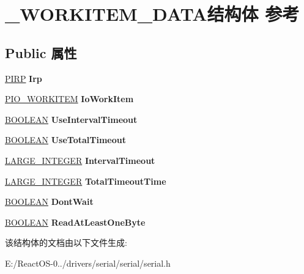 \hypertarget{struct___w_o_r_k_i_t_e_m___d_a_t_a}{}\section{\+\_\+\+W\+O\+R\+K\+I\+T\+E\+M\+\_\+\+D\+A\+T\+A结构体 参考}
\label{struct___w_o_r_k_i_t_e_m___d_a_t_a}
\subsection*{Public 属性}
\begin{DoxyCompactItemize}
\item 
\mbox{\label{struct___w_o_r_k_i_t_e_m___d_a_t_a_ac4972c116f355447807c84ffda0be9cf}} 
\hyperlink{interfacevoid}{P\+I\+RP} {\bfseries Irp}
\item 
\mbox{\label{struct___w_o_r_k_i_t_e_m___d_a_t_a_af7661dc7439025cd39318204c84219e5}} 
\hyperlink{struct___i_o___w_o_r_k_i_t_e_m}{P\+I\+O\+\_\+\+W\+O\+R\+K\+I\+T\+EM} {\bfseries Io\+Work\+Item}
\item 
\mbox{\label{struct___w_o_r_k_i_t_e_m___d_a_t_a_ad078ddd3267206279fa9e5b973d47859}} 
\hyperlink{_processor_bind_8h_a112e3146cb38b6ee95e64d85842e380a}{B\+O\+O\+L\+E\+AN} {\bfseries Use\+Interval\+Timeout}
\item 
\mbox{\label{struct___w_o_r_k_i_t_e_m___d_a_t_a_a3a4d9a446d4adfda568f34b0472eb627}} 
\hyperlink{_processor_bind_8h_a112e3146cb38b6ee95e64d85842e380a}{B\+O\+O\+L\+E\+AN} {\bfseries Use\+Total\+Timeout}
\item 
\mbox{\label{struct___w_o_r_k_i_t_e_m___d_a_t_a_a1150fc9fd046ec62beb5b4f586494ad3}} 
\hyperlink{union___l_a_r_g_e___i_n_t_e_g_e_r}{L\+A\+R\+G\+E\+\_\+\+I\+N\+T\+E\+G\+ER} {\bfseries Interval\+Timeout}
\item 
\mbox{\label{struct___w_o_r_k_i_t_e_m___d_a_t_a_a10edd9d047be9ca6d4a0b2ee3a00a6d2}} 
\hyperlink{union___l_a_r_g_e___i_n_t_e_g_e_r}{L\+A\+R\+G\+E\+\_\+\+I\+N\+T\+E\+G\+ER} {\bfseries Total\+Timeout\+Time}
\item 
\mbox{\label{struct___w_o_r_k_i_t_e_m___d_a_t_a_afe41f84534d7aa27f2f6f6a34499f667}} 
\hyperlink{_processor_bind_8h_a112e3146cb38b6ee95e64d85842e380a}{B\+O\+O\+L\+E\+AN} {\bfseries Dont\+Wait}
\item 
\mbox{\label{struct___w_o_r_k_i_t_e_m___d_a_t_a_a2cc969a0c7433563bbec2f553fbacc10}} 
\hyperlink{_processor_bind_8h_a112e3146cb38b6ee95e64d85842e380a}{B\+O\+O\+L\+E\+AN} {\bfseries Read\+At\+Least\+One\+Byte}
\end{DoxyCompactItemize}


该结构体的文档由以下文件生成\+:\begin{DoxyCompactItemize}
\item 
E\+:/\+React\+O\+S-\/0../drivers/serial/serial/serial.\+h\end{DoxyCompactItemize}
